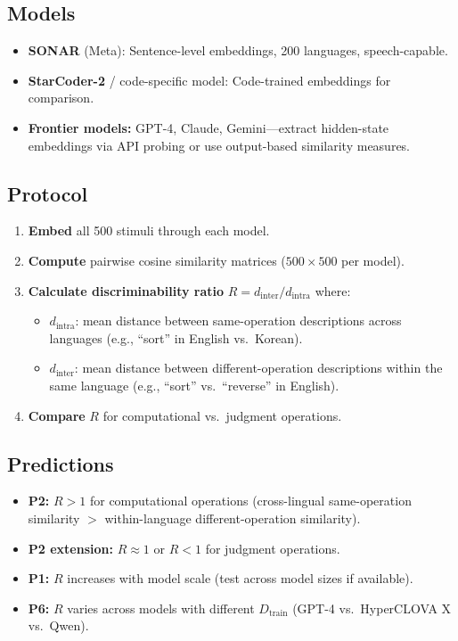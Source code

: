 \documentclass[11pt]{article}
\theoremstyle{definition}
\newcommand{\Dtrain}{D_{\text{train}}}
\begin{document}
\subsection{Models}

\begin{itemize}[nosep]
  \item \textbf{SONAR} (Meta): Sentence-level embeddings, 200 languages, speech-capable.
  \item \textbf{StarCoder-2} / code-specific model: Code-trained embeddings for comparison.
  \item \textbf{Frontier models:} GPT-4, Claude, Gemini---extract hidden-state embeddings via API probing or use output-based similarity measures.
\end{itemize}

\subsection{Protocol}

\begin{enumerate}[nosep]
  \item \textbf{Embed} all 500 stimuli through each model.
  \item \textbf{Compute} pairwise cosine similarity matrices ($500 \times 500$ per model).
  \item \textbf{Calculate discriminability ratio} $R = d_{\text{inter}} / d_{\text{intra}}$ where:
    \begin{itemize}[nosep]
      \item $d_{\text{intra}}$: mean distance between same-operation descriptions across languages (e.g., ``sort'' in English vs.\ Korean).
      \item $d_{\text{inter}}$: mean distance between different-operation descriptions within the same language (e.g., ``sort'' vs.\ ``reverse'' in English).
    \end{itemize}
  \item \textbf{Compare} $R$ for computational vs.\ judgment operations.
\end{enumerate}

\subsection{Predictions}

\begin{itemize}[nosep]
  \item \textbf{P2:} $R > 1$ for computational operations (cross-lingual same-operation similarity $>$ within-language different-operation similarity).
  \item \textbf{P2 extension:} $R \approx 1$ or $R < 1$ for judgment operations.
  \item \textbf{P1:} $R$ increases with model scale (test across model sizes if available).
  \item \textbf{P6:} $R$ varies across models with different $\Dtrain$ (GPT-4 vs.\ HyperCLOVA X vs.\ Qwen).
\end{itemize}
\end{document}
